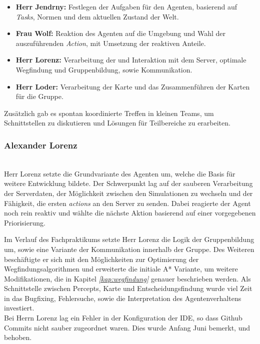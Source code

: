 \begin{itemize}
    \item \textbf{Herr Jendrny:} Festlegen der Aufgaben für den Agenten, basierend auf \textit{Tasks}, Normen und dem aktuellen Zustand der Welt.  
    \item \textbf{Frau Wolf:} Reaktion des Agenten auf die Umgebung und Wahl der auszuführenden \textit{Action}, mit Umsetzung der reaktiven Anteile.
    \item \textbf{Herr Lorenz:} Verarbeitung der \Percepts und Interaktion mit dem Server, optimale Wegfindung und Gruppenbildung, sowie Kommunikation.
    \item \textbf{Herr Loder:} Verarbeitung der Karte und das Zusammenführen der Karten für die Gruppe.
\end{itemize}

Zusätzlich gab es spontan koordinierte Treffen in kleinen Teams, um Schnittstellen zu diskutieren und Lösungen für Teilbereiche zu erarbeiten. 

\subsubsection{Alexander Lorenz} ~\\
Herr Lorenz setzte die Grundvariante des Agenten um, welche die Basis für weitere Entwicklung bildete. Der Schwerpunkt lag auf der sauberen Verarbeitung der Serverdaten, der Möglichkeit zwischen den Simulationen zu wechseln und der Fähigkeit, die ersten \textit{actions} an den Server zu senden. Dabei reagierte der Agent noch rein reaktiv und wählte die nächste Aktion basierend auf einer vorgegebenen Priorisierung. \newline

Im Verlauf des Fachpraktikums setzte Herr Lorenz die Logik der Gruppenbildung um, sowie eine Variante der Kommunikation innerhalb der Gruppe. Des Weiteren beschäftigte er sich mit den Möglichkeiten zur Optimierung der Wegfindungsalgorithmen und erweiterte die initiale A* Variante, um weitere Modifikationen, die in Kapitel \textit{\ref{kap:wegfindung}} genauer beschrieben werden. Als Schnittstelle zwischen Percepts, Karte und Entscheidungsfindung wurde viel Zeit in das Bugfixing, Fehlersuche, sowie die Interpretation des Agentenverhaltens investiert. \\

Bei Herrn Lorenz lag ein Fehler in der Konfiguration der IDE, so dass Github Commits nicht sauber zugeordnet waren. Dies wurde Anfang Juni bemerkt, und behoben.  

